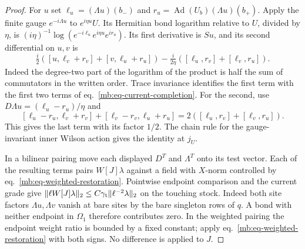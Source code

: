 \documentclass[11pt,letterpaper,reqno]{amsart}
\numberwithin{equation}{section}
\renewcommand{\eqref}[1]{\textup{eq.~\ref{#1}}}
\theoremstyle{definition}
\theoremstyle{remark}
\begin{document}
\begin{proof}
For \(u\) set \(\ell_u=(\Lambda u)(b_-)\) and \(r_u=\operatorname{Ad}(U_b)(\Lambda u)(b_+)\). Apply the finite gauge \(e^{-i\Lambda u}\) to \(e^{i\eta u}U\). Its Hermitian bond logarithm relative to \(U\), divided by \(\eta\), is
\((i\eta)^{-1}\log(e^{-i\ell_u}e^{i\eta u}e^{i r_u})\).
Its first derivative is \(Su\), and its second differential on \(u,v\) is
\[
 \tfrac i2([u,\ell_v+r_v]+[v,\ell_u+r_u])
     -\tfrac i{2\eta}([\ell_u,r_v]+[\ell_v,r_u]).
\]
Indeed the degree-two part of the logarithm of the product is half the sum of commutators in the written order. Trace invariance identifies the first term with the first two terms of \eqref{mb:eq-current-completion}. For the second, use \(D\Lambda u=(\ell_u-r_u)/\eta\) and
\[
 [\ell_u-r_u,\ell_v+r_v]+[\ell_v-r_v,\ell_u+r_u]
                  =2([\ell_u,r_v]+[\ell_v,r_u]).
\]
This gives the last term with its factor \(1/2\). The chain rule for the gauge-invariant inner Wilson action gives the identity at \(j_U\).

In a bilinear pairing move each displayed \(D^T\) and \(\Lambda^T\) onto its test vector. Each of the resulting terms pairs \(W[J]\lambda\) against a field with \(X\)-norm controlled by \eqref{mb:eq-weighted-restoration}. Pointwise endpoint comparison and the current grade give
\(\|\ell W[J]\lambda\|_2\le C\gamma_{\rm t}\|\ell^{-2}\lambda\|_2\)
on the touching stock. Indeed both site factors \(\Lambda u,\Lambda v\) vanish at bare sites by the bare singleton rows of \(q\). A bond with neither endpoint in \(\Omega_1\) therefore contributes zero. In the weighted pairing the endpoint weight ratio is bounded by a fixed constant; apply \eqref{mb:eq-weighted-restoration} with both signs. No difference is applied to \(J\).
\end{proof}
\end{document}
